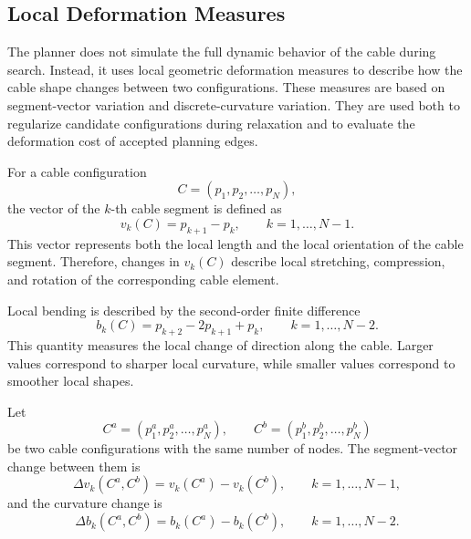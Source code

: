 \documentclass{pas}
\begin{document}
\subsection{Local Deformation Measures}
\label{subsec:gcr_elastic_deformation_measures}

The planner does not simulate the full dynamic behavior of the cable during
search. Instead, it uses local geometric deformation measures to describe how
the cable shape changes between two configurations. These measures are based on
segment-vector variation and discrete-curvature variation. They are used both to
regularize candidate configurations during relaxation and to evaluate the
deformation cost of accepted planning edges.

For a cable configuration
\begin{equation}
C=(p_1,p_2,\ldots,p_N),
\end{equation}
the vector of the \(k\)-th cable segment is defined as
\begin{equation}
v_k(C)=p_{k+1}-p_k,
\qquad
k=1,\ldots,N-1.
\label{eq:gcr_segment_vector}
\end{equation}
This vector represents both the local length and the local orientation of the
cable segment. Therefore, changes in \(v_k(C)\) describe local stretching,
compression, and rotation of the corresponding cable element.

Local bending is described by the second-order finite difference
\begin{equation}
b_k(C)=p_{k+2}-2p_{k+1}+p_k,
\qquad
k=1,\ldots,N-2.
\label{eq:gcr_discrete_curvature}
\end{equation}
This quantity measures the local change of direction along the cable. Larger
values correspond to sharper local curvature, while smaller values correspond to
smoother local shapes.

Let
\begin{equation}
C^a=(p^a_1,p^a_2,\ldots,p^a_N),
\qquad
C^b=(p^b_1,p^b_2,\ldots,p^b_N)
\end{equation}
be two cable configurations with the same number of nodes. The segment-vector
change between them is
\begin{equation}
\Delta v_k(C^a,C^b)
=
v_k(C^a)-v_k(C^b),
\qquad
k=1,\ldots,N-1,
\label{eq:gcr_segment_vector_change}
\end{equation}
and the curvature change is
\begin{equation}
\Delta b_k(C^a,C^b)
=
b_k(C^a)-b_k(C^b),
\qquad
k=1,\ldots,N-2.
\label{eq:gcr_curvature_change}
\end{equation}
\end{document}
